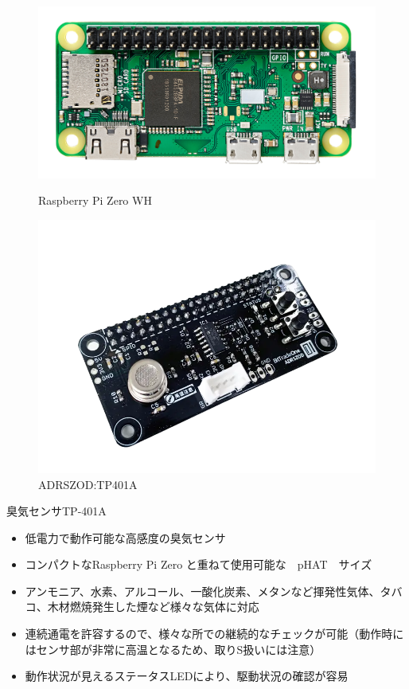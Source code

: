 \documentclass[12pt,a4paper,uplatex]{jsarticle}
\begin{document}
\begin{figure}[H]
	\begin{minipage}[b]{0.45\linewidth}
		\centering
		\includegraphics[keepaspectratio, scale=0.13]{figs/jpg/udrpzwh.jpg}
		\caption{Raspberry Pi Zero WH}
	\end{minipage}
	\hspace{1.0cm}
	\begin{minipage}[b]{0.45\linewidth}
		\centering
		\includegraphics[keepaspectratio, scale=0.25]{figs/png/nioi_sensor.png}
		\caption{ADRSZOD:TP401A}
	\end{minipage}
\end{figure}

臭気センサTP-401A

\begin{itemize}
	\item 低電力で動作可能な高感度の臭気センサ
	\item コンパクトなRaspberry Pi Zero と重ねて使用可能な　pHAT　サイズ
	\item アンモニア、水素、アルコール、一酸化炭素、メタンなど揮発性気体、タバコ、木材燃焼発生した煙など様々な気体に対応
	\item 連続通電を許容するので、様々な所での継続的なチェックが可能（動作時にはセンサ部が非常に高温となるため、取りS扱いには注意）
	\item 動作状況が見えるステータスLEDにより、駆動状況の確認が容易
\end{itemize}
\end{document}
